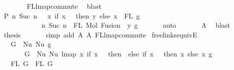 \begin{isabellebody}
\ \ \ \ \ \ \isamarkupfalse%
\ FL{\isacharunderscore}{\kern0pt}lmap{\isacharunderscore}{\kern0pt}commute\ \isamarkupfalse%
\ blast\isanewline
\ \ \isamarkupfalse%
\ P{}{\isacharcolon}{\kern0pt}\ {\isachardoublequoteopen}{\isacharbraceleft}{\kern0pt}n{\isachardot}{\kern0pt}\ Suc\ n\ {\isasymin}\ {\isacharparenleft}{\kern0pt}{\isasymlambda}\ x{\isachardot}{\kern0pt}\ if\ x\ {\isacharequal}{\kern0pt}\ {}\ then\ y\ else\ x{\isacharparenright}{\kern0pt}\ {\isacharbackquote}{\kern0pt}\ FL\ g{\isacharbraceright}{\kern0pt}\ {\isacharequal}{\kern0pt}\isanewline
\ \ \ \ \ \ \ \ \ \ \ \ {\isacharbraceleft}{\kern0pt}n{\isachardot}{\kern0pt}\ Suc\ n\ {\isasymin}\ FL\ {\isacharparenleft}{\kern0pt}Mol\ {\isacharparenleft}{\kern0pt}Fusion\ {}\ y{\isacharparenright}{\kern0pt}\ g{\isacharparenright}{\kern0pt}{\isacharbraceright}{\kern0pt}{\isachardoublequoteclose}\isanewline
\ \ \ \ \ \isamarkupfalse%
\ auto\isanewline
\ \ \ \ \ \isamarkupfalse%
\ A{}\ \isamarkupfalse%
\ blast\isanewline
\ \ \isamarkupfalse%
\ \isamarkupfalse%
\ {\isacharquery}{\kern0pt}thesis\isanewline
\ \ \ \ \ \isamarkupfalse%
\ {\isacharparenleft}{\kern0pt}simp\ add{\isacharcolon}{\kern0pt}\ A{}\ A{}\ FL{\isacharunderscore}{\kern0pt}lmap{\isacharunderscore}{\kern0pt}commute{\isacharparenright}{\kern0pt}\isanewline
{}\isamarkupfalse%
%
\endisatagproof
{\isafoldproof}%
%
\isadelimproof
\isanewline
%
\endisadelimproof
\isanewline
\isanewline
{}\isamarkupfalse%
\ freelinks{\isacharunderscore}{\kern0pt}equiv{\isacharunderscore}{\kern0pt}E{}{\isacharcolon}{\kern0pt}\isanewline
\ \ \ {\isachardoublequoteopen}G{}\ {\isacharequal}{\kern0pt}\ Nu\ {\isacharparenleft}{\kern0pt}Nu\ g{\isacharparenright}{\kern0pt}{\isachardoublequoteclose}\isanewline
\ \ \ \ \ \ \ {\isachardoublequoteopen}G{}\ {\isacharequal}{\kern0pt}\ Nu\ {\isacharparenleft}{\kern0pt}Nu\ {\isacharparenleft}{\kern0pt}lmap\ {\isacharparenleft}{\kern0pt}{\isasymlambda}x{\isachardot}{\kern0pt}\ if\ x\ {\isacharequal}{\kern0pt}\ {}\ then\ {}\ else\ if\ x\ {\isacharequal}{\kern0pt}\ {}\ then\ x\ else\ x{\isacharparenright}{\kern0pt}\ g{\isacharparenright}{\kern0pt}{\isacharparenright}{\kern0pt}{\isachardoublequoteclose}\isanewline
\ \ \ {\isachardoublequoteopen}FL\ G{}\ {\isacharequal}{\kern0pt}\ FL\ G{}{\isachardoublequoteclose}\isanewline

\end{isabellebody}
